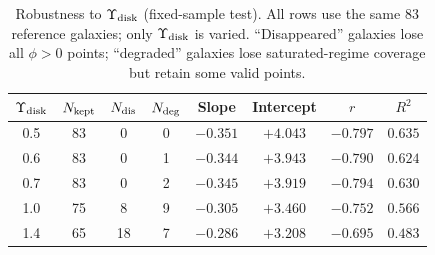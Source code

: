 \begin{table}[htbp]
\centering
\caption{Robustness to $\Upsilon_{\rm disk}$ (fixed-sample test).
         All rows use the same 83 reference galaxies; only $\Upsilon_{\rm disk}$ is varied.
         ``Disappeared'' galaxies lose all $\phi>0$ points;
         ``degraded'' galaxies lose saturated-regime coverage but retain some valid points.}
\label{tab:ml}
\begin{tabular}{cccccccc}
\hline
$\Upsilon_{\rm disk}$ & $N_{\rm kept}$ & $N_{\rm dis}$ & $N_{\rm deg}$ & Slope & Intercept & $r$ & $R^2$ \\
\hline
0.5 & 83 & 0 & 0 & $-0.351$ & $+4.043$ & $-0.797$ & $0.635$ \\
0.6 & 83 & 0 & 1 & $-0.344$ & $+3.943$ & $-0.790$ & $0.624$ \\
0.7 & 83 & 0 & 2 & $-0.345$ & $+3.919$ & $-0.794$ & $0.630$ \\
1.0 & 75 & 8 & 9 & $-0.305$ & $+3.460$ & $-0.752$ & $0.566$ \\
1.4 & 65 & 18 & 7 & $-0.286$ & $+3.208$ & $-0.695$ & $0.483$ \\
\hline
\end{tabular}
\end{table}
